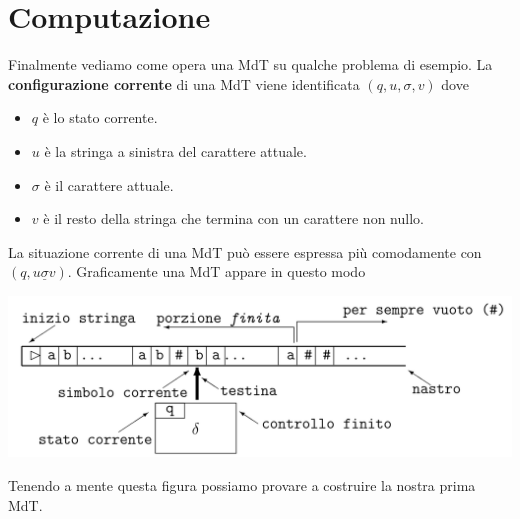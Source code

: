 \section{Computazione}
Finalmente vediamo come opera una MdT su qualche problema di
esempio. La \textbf{configurazione corrente} di una MdT viene
identificata $(q, u, \sigma, v)$ dove
\begin{itemize}
	\item $q$ è lo stato corrente.
	\item $u$ è la stringa a sinistra del carattere attuale.
	\item $\sigma$ è il carattere attuale.
	\item $v$ è il resto della stringa che termina con un
	      carattere non nullo.
\end{itemize}
La situazione corrente di una MdT può essere espressa più
comodamente con $(q, u \underline{\sigma} v)$. Graficamente
una MdT appare in questo modo
\begin{center}
	\includegraphics[scale=0.225]{images/turing.png}
\end{center}
Tenendo a mente questa figura possiamo provare a costruire la
nostra prima MdT.

